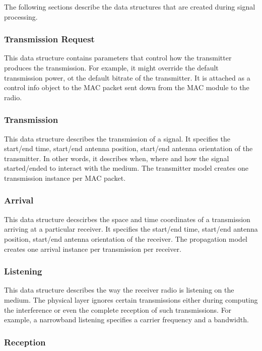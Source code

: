The following sections describe the data structures that are created during
signal processing.

\subsubsection{Transmission Request}

This data structure contains parameters that control how the transmitter
produces the transmission. For example, it might override the default
transmission power, ot the default bitrate of the transmitter. It is attached as
a control info object to the MAC packet sent down from the MAC module to the
radio.

\subsubsection{Transmission}

This data structure describes the transmission of a signal. It specifies the
start/end time, start/end antenna position, start/end antenna orientation of the
transmitter. In other words, it describes when, where and how the signal
started/ended to interact with the medium. The transmitter model creates one
transmission instance per MAC packet.

\subsubsection{Arrival}

This data structure decscirbes the space and time coordinates of a transmission
arriving at a particular receiver. It specifies the start/end time, start/end
antenna position, start/end antenna orientation of the receiver. The propagation
model creates one arrival instance per transmission per receiver.

\subsubsection{Listening}

This data structure describes the way the receiver radio is listening on the
medium. The physical layer ignores certain transmissions either during computing
the interference or even the complete reception of such transmissions. For
example, a narrowband listening specifies a carrier frequency and a bandwidth. 

\subsubsection{Reception}

